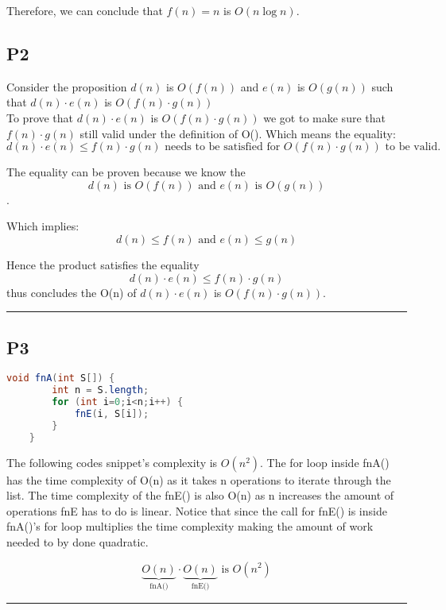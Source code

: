 Therefore, we can conclude that $f(n) = n$ is $O(n \log n)$.

\pagebreak

\small \subsection*{P2}

Consider the proposition $d(n)$ is $O(f(n))$ and $e(n)$ is $O(g(n))$ such that $d(n) \cdot e(n)$ is $O(f(n) \cdot g(n))$\\

To prove that $d(n) \cdot e(n)$ is $O(f(n) \cdot g(n))$ we got to make sure that $f(n) \cdot g(n)$ still valid under the definition of O(). Which means the equality:
$$d(n) \cdot e(n) \leq f(n) \cdot g(n) \text{ needs to be satisfied for $O(f(n)\cdot g(n))$ to be valid.}$$ 

The equality can be proven because we know the $$d(n) \text{ is } O(f(n)) \text{ and } e(n) \text{ is } O(g(n))$$.

\indent
Which implies: $$ d(n) \leq f(n) \text{ and } e(n) \leq g(n)$$

Hence the product satisfies the equality $$ d(n) \cdot e(n) \leq f(n) \cdot g(n)$$ thus concludes the O(n) of $d(n) \cdot e(n)$ is $O(f(n)\cdot g(n))$.

\vspace*{16pt}
\hrule


\small \subsection*{P3}

\begin{lstlisting}[language=Java] 
    void fnA(int S[]) {
        int n = S.length;
        for (int i=0;i<n;i++) {
            fnE(i, S[i]);
        }
    }
\end{lstlisting}

The following codes snippet's complexity is $O(n^2)$. The for loop inside fnA() has the time complexity of O(n) as it takes n operations to iterate through the list. The time complexity of the fnE() is also O(n) as n increases the amount of operations fnE has to do is linear. Notice that since the call for fnE() is inside fnA()'s for loop multiplies the time complexity making the amount of work needed to by done quadratic. 

$$ \underbrace{O(n)}_{\text{fnA()}}  \cdot \underbrace{O(n)}_{\text{fnE()}} \text{ is } O(n^2 ) $$

\vspace*{16pt}
\hrule

